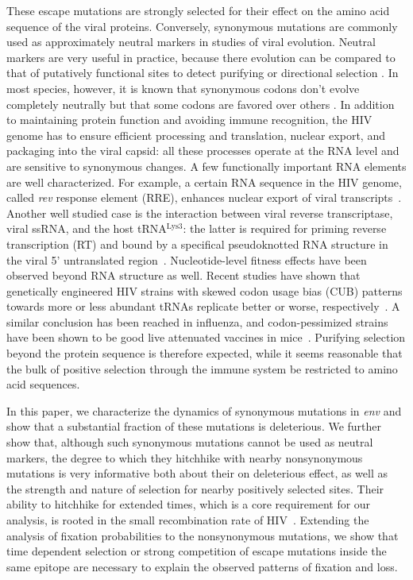 \documentclass[rmp, twocolumn]{revtex4}
\newcommand{\rev}{\textit{rev}}
\newcommand{\env}{\textit{env}}
\begin{document}
These escape mutations are strongly selected for their effect on the amino acid
sequence of the viral proteins. Conversely, synonymous mutations are commonly
used as approximately neutral markers in studies of viral evolution. Neutral
markers are very useful in practice, because there evolution can be compared to
that of putatively functional sites to detect purifying or directional selection
\citep{Bhatt:2011p43255,Hurst:2002p32608,Chen:2004p22606}. In most species,
however, it is  known that synonymous codons don't evolve completely neutrally
but that some codons are favored over others \citep{plotkin_synonymous_2011}.
In addition to maintaining protein function and avoiding immune
recognition, the HIV genome has to ensure efficient processing and translation,
nuclear export, and packaging into the viral capsid: all these processes operate at the RNA
level and are sensitive to synonymous changes. A few functionally important RNA
elements are well characterized. For example, a certain RNA sequence in the HIV
genome, called \rev{} response element (RRE), enhances nuclear export of viral
transcripts~\citep{fernandes_hiv-1_2012}. Another well studied case is the
interaction between viral reverse transcriptase, viral ssRNA, and the host
tRNA$^\text{Lys3}$: the latter is required for priming reverse transcription
(RT) and bound by a specifical pseudoknotted RNA structure in the viral 5'
untranslated region~\citep{barat_interaction_1991, paillart_vitro_2002}.
Nucleotide-level fitness effects have been observed beyond RNA structure as
well. Recent studies have shown that genetically engineered HIV strains with
skewed codon usage bias (CUB) patterns towards more or less abundant tRNAs
replicate better or worse, respectively~\citep{ngumbela_quantitative_2008,
li_codon-usage-based_2012}. A similar conclusion has been reached in influenza,
and codon-pessimized strains have been shown to be good live attenuated vaccines
in mice~\citep{mueller_live_2010}. Purifying selection beyond the protein
sequence is therefore expected, while it seems reasonable that the bulk of
positive selection through the immune system be restricted to amino acid
sequences.


In this paper, we characterize the dynamics of synonymous mutations in \env{}
and show that a substantial fraction of these mutations is deleterious. We
further show that, although such synonymous mutations cannot be used as neutral
markers, the degree to which they hitchhike with nearby nonsynonymous mutations
is very informative both about their on deleterious effect, as well as the
strength and nature of selection for nearby positively selected sites.
Their ability to hitchhike for extended times, which is a core requirement for
our analysis, is rooted in the small recombination rate of
HIV~\citep{neher_recombination_2010, batorsky_estimate_2011}. Extending the
analysis of fixation probabilities to the nonsynonymous mutations, we show that
time dependent selection or strong competition of escape mutations inside the
same epitope are necessary to explain the observed patterns of fixation and
loss.
\end{document}
